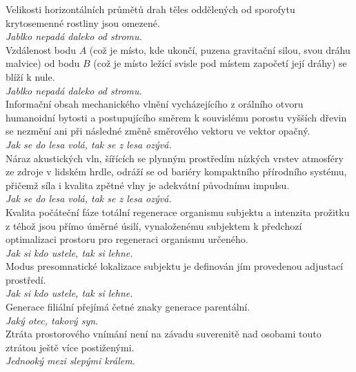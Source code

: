 \begin{multicols}{\value{columnsgames}}
\noindent
Velikosti horizontálních průmětů drah těles oddělených od
sporofytu krytosemenné rostliny jsou omezené.\\[1 mm]
{\sl Jablko nepadá daleko od stromu.}\\

\noindent
Vzdálenost bodu $A$ (což je místo, kde ukončí, puzena gravitační
silou, svou dráhu malvice) od bodu $B$ (což je místo ležící svisle
pod místem započetí její dráhy) se blíží k nule.\\[1 mm]
{\sl Jablko nepadá daleko od stromu.}\\

\noindent
Informační obsah mechanického vlnění vycházejícího z orálního
otvoru humanoidní bytosti a postupujícího směrem k souvislému
porostu vyšších dřevin se nezmění ani při následné změně směrového
vektoru ve vektor opačný.\\[1 mm]
{\sl Jak se do lesa volá, tak se z lesa ozývá.}\\

\noindent
Náraz akustických vln, šířících se plynným prostředím nízkých
vrstev atmosféry ze zdroje v lidském hrdle, odráží se od bariéry
kompaktního přírodního systému, přičemž síla i kvalita zpětné vlny
je adekvátní původnímu impulsu.\\[1 mm]
{\sl Jak se do lesa volá, tak se z lesa ozývá.}\\

\noindent
Kvalita počáteční fáze totální regenerace organismu subjektu
a intenzita prožitku z téhož jsou přímo úměrné úsilí, vynaloženému
subjektem k předchozí optimalizaci prostoru pro regeneraci organismu
určeného.\\[1 mm]
{\sl Jak si kdo ustele, tak si lehne.}\\

\noindent
Modus presomnatické lokalizace subjektu je definován jím
provedenou adjustací prostředí.\\[1 mm]
{\sl Jak si kdo ustele, tak si lehne.}\\

\noindent
Generace filiální přejímá četné znaky generace parentální.\\[1 mm]
{\sl Jaký otec, takový syn.}\\

\noindent
Ztráta prostorového vnímání není na závadu suverenitě nad
osobami touto ztrátou ještě více postiženými.\\[1 mm]
{\sl Jednooký mezi slepými králem.}\\


\end{multicols}
